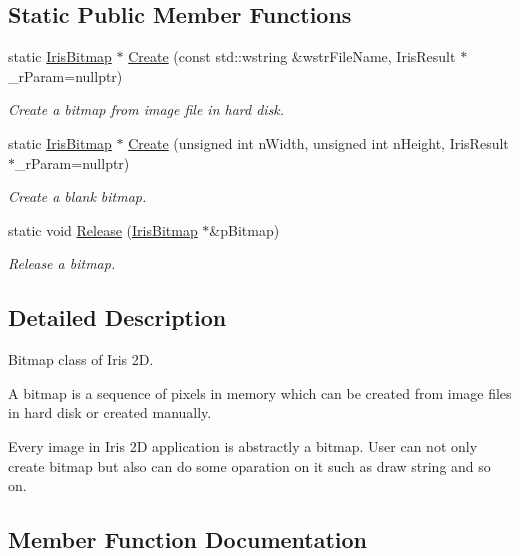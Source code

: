 \subsection*{Static Public Member Functions}
\begin{DoxyCompactItemize}
\item 
static \hyperlink{class_iris2_d_1_1_iris_bitmap}{Iris\+Bitmap} $\ast$ \hyperlink{class_iris2_d_1_1_iris_bitmap_ac9d31fd83b64c4051e1474eb7322442f}{Create} (const std\+::wstring \&wstr\+File\+Name, Iris\+Result $\ast$\+\_\+r\+Param=nullptr)
\begin{DoxyCompactList}\small\item\em Create a bitmap from image file in hard disk. \end{DoxyCompactList}\item 
static \hyperlink{class_iris2_d_1_1_iris_bitmap}{Iris\+Bitmap} $\ast$ \hyperlink{class_iris2_d_1_1_iris_bitmap_a42a6c58440df5bb965a2d299cd3620e4}{Create} (unsigned int n\+Width, unsigned int n\+Height, Iris\+Result $\ast$\+\_\+r\+Param=nullptr)
\begin{DoxyCompactList}\small\item\em Create a blank bitmap. \end{DoxyCompactList}\item 
static void \hyperlink{class_iris2_d_1_1_iris_bitmap_a30f09c40ae048de40f06c0a1d6575441}{Release} (\hyperlink{class_iris2_d_1_1_iris_bitmap}{Iris\+Bitmap} $\ast$\&p\+Bitmap)
\begin{DoxyCompactList}\small\item\em Release a bitmap. \end{DoxyCompactList}\end{DoxyCompactItemize}


\subsection{Detailed Description}
Bitmap class of Iris 2D. 

A bitmap is a sequence of pixels in memory which can be created from image files in hard disk or created manually.

Every image in Iris 2D application is abstractly a bitmap. User can not only create bitmap but also can do some oparation on it such as draw string and so on. 

\subsection{Member Function Documentation}
\mbox{\label{class_iris2_d_1_1_iris_bitmap_ac9d31fd83b64c4051e1474eb7322442f}} 
